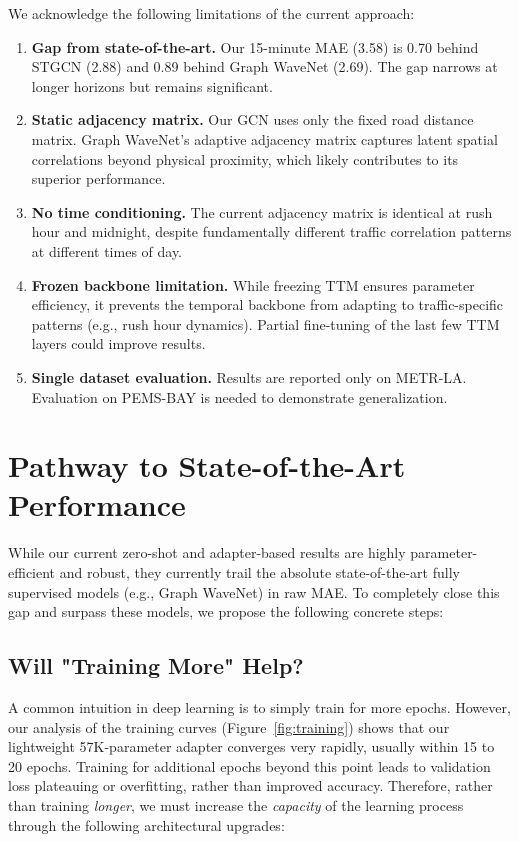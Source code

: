 \documentclass[11pt, a4paper]{article}
\begin{document}
We acknowledge the following limitations of the current approach:

\begin{enumerate}
    \item \textbf{Gap from state-of-the-art.} Our 15-minute MAE (3.58) is 0.70 behind STGCN (2.88) and 0.89 behind Graph WaveNet (2.69). The gap narrows at longer horizons but remains significant.
    
    \item \textbf{Static adjacency matrix.} Our GCN uses only the fixed road distance matrix. Graph WaveNet's adaptive adjacency matrix captures latent spatial correlations beyond physical proximity, which likely contributes to its superior performance.
    
    \item \textbf{No time conditioning.} The current adjacency matrix is identical at rush hour and midnight, despite fundamentally different traffic correlation patterns at different times of day.
    
    \item \textbf{Frozen backbone limitation.} While freezing TTM ensures parameter efficiency, it prevents the temporal backbone from adapting to traffic-specific patterns (e.g., rush hour dynamics). Partial fine-tuning of the last few TTM layers could improve results.
    
    \item \textbf{Single dataset evaluation.} Results are reported only on METR-LA. Evaluation on PEMS-BAY is needed to demonstrate generalization.
\end{enumerate}

\section{Pathway to State-of-the-Art Performance}
\label{sec:future}

While our current zero-shot and adapter-based results are highly parameter-efficient and robust, they currently trail the absolute state-of-the-art fully supervised models (e.g., Graph WaveNet) in raw MAE. To completely close this gap and surpass these models, we propose the following concrete steps:

\subsection{Will "Training More" Help?}
A common intuition in deep learning is to simply train for more epochs. However, our analysis of the training curves (Figure~\ref{fig:training}) shows that our lightweight 57K-parameter adapter converges very rapidly, usually within 15 to 20 epochs. Training for additional epochs beyond this point leads to validation loss plateauing or overfitting, rather than improved accuracy. Therefore, rather than training \textit{longer}, we must increase the \textit{capacity} of the learning process through the following architectural upgrades:
\end{document}
